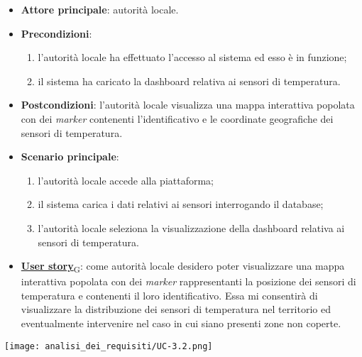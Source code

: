 \begin{itemize}
	\item \textbf{Attore principale}: autorità locale.
	\item \textbf{Precondizioni}:
	      \begin{enumerate}
		      \item l'autorità locale ha effettuato l'accesso al sistema ed esso è in funzione;
		      \item il sistema ha caricato la dashboard relativa ai sensori di temperatura.
	      \end{enumerate}
	\item \textbf{Postcondizioni}: l'autorità locale visualizza una mappa interattiva popolata con dei \textit{marker} contenenti l'identificativo e le coordinate geografiche dei sensori di temperatura.
	\item \textbf{Scenario principale}:
	      \begin{enumerate}
		      \item l'autorità locale accede alla piattaforma;
		      \item il sistema carica i dati relativi ai sensori interrogando il database;
		      \item l'autorità locale seleziona la visualizzazione della dashboard relativa ai sensori di temperatura.
	      \end{enumerate}
	\item \href{https://7last.github.io/docs/rtb/documentazione-interna/glossario\#user-story}{\textbf{User story}\textsubscript{G}}:
	      come autorità locale desidero poter visualizzare una mappa interattiva popolata con dei \textit{marker} rappresentanti la posizione dei sensori di temperatura e contenenti il loro identificativo. Essa mi consentirà di visualizzare la distribuzione dei sensori di temperatura nel territorio ed eventualmente intervenire nel caso in cui siano presenti zone non coperte.
\end{itemize}
\begin{center}
	\texttt{[image: analisi\_dei\_requisiti/UC-3.2.png]}
\end{center}


